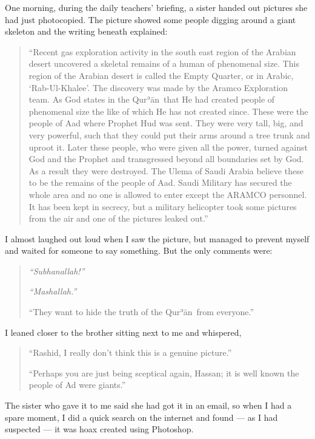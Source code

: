 \documentclass[12pt]{memoir}
\def\´{ʾ} %
\newcommand{\cor}[2]{#2} %
\def \Quran{Qur\-\´ān} %
\begin{document}
One morning, during the daily teachers’ briefing,
a sister handed out pictures she had just photocopied.
The picture showed some people digging around a giant skeleton
and the writing beneath explained:

\begin{quote}
“Recent gas exploration activity in the south east region of the Arabian desert
uncovered a skeletal remains of a human of phenomenal size.
This region of the Arabian desert is called the Empty Quarter,
or in Arabic, ‘Rab-Ul-Khalee’.
The discovery was made by the Aramco Exploration team.
As God states in the \Quran\ that He had created people of phenomenal size
the like of which He has not created since.
These were the people of Aad where Prophet Hud was sent.
They were very tall, big, and very powerful,
such that they could put their arms around a tree trunk and uproot it.
Later these people, who were given all the power,
turned against God and the Prophet and transgressed
beyond all boundaries set by God.
As a result they were destroyed.
The Ulema of Saudi Arabia believe these to be the remains of the people of Aad.
Saudi Military has secured the whole area and no one is allowed
to enter except the ARAMCO personnel.
It has been kept in secrecy, but a military helicopter took some pictures
from the air and one of the pictures leaked out.”
\end{quote}

I almost laughed out loud when I saw the picture,
but managed to prevent myself and waited for someone to say something.
But the only comments were:

\begin{quote}
\emph{“Subhanallah!”}

\emph{“Mashallah.”}

“They want to hide the truth of the \Quran\ from everyone.”
\end{quote}

I leaned closer to the brother sitting next to me and whispered,

\begin{quote}
“Rashid, I really don’t think this is a genuine picture.”

“Perhaps you are just being sceptical again, Hassan;
it is well know\cor{}{n} the people of Ad were giants.”
\end{quote}

The sister who gave it to me said she had got it in an email,
so when I had a spare moment, I did a quick search on the internet and found —
as I had suspected — it was hoax created using Photoshop.
\end{document}
